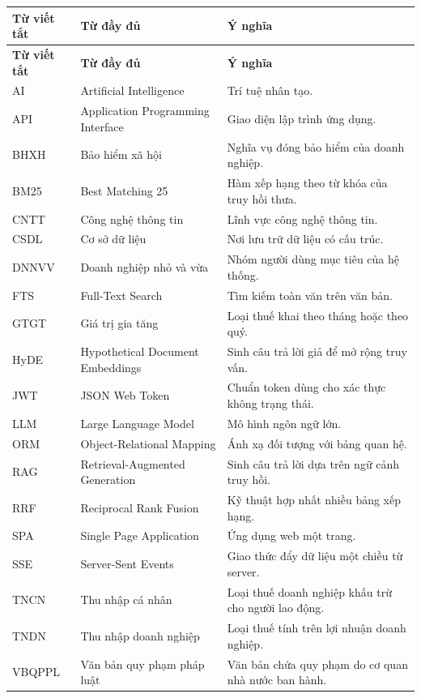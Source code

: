 \documentclass[12pt,a4paper]{report}
\numberwithin{equation}{chapter}
\numberwithin{figure}{chapter}
\numberwithin{table}{chapter}
\begin{document}
\begin{longtable}{p{2.8cm}p{5.5cm}p{6cm}}
\toprule
\textbf{Từ viết tắt} & \textbf{Từ đầy đủ} & \textbf{Ý nghĩa} \\
\midrule
\endfirsthead

\toprule
\textbf{Từ viết tắt} & \textbf{Từ đầy đủ} & \textbf{Ý nghĩa} \\
\midrule
\endhead

AI & Artificial Intelligence & Trí tuệ nhân tạo. \\
API & Application Programming Interface & Giao diện lập trình ứng dụng. \\
BHXH & Bảo hiểm xã hội & Nghĩa vụ đóng bảo hiểm của doanh nghiệp. \\
BM25 & Best Matching 25 & Hàm xếp hạng theo từ khóa của truy hồi thưa. \\
CNTT & Công nghệ thông tin & Lĩnh vực công nghệ thông tin. \\
CSDL & Cơ sở dữ liệu & Nơi lưu trữ dữ liệu có cấu trúc. \\
DNNVV & Doanh nghiệp nhỏ và vừa & Nhóm người dùng mục tiêu của hệ thống. \\
FTS & Full-Text Search & Tìm kiếm toàn văn trên văn bản. \\
GTGT & Giá trị gia tăng & Loại thuế khai theo tháng hoặc theo quý. \\
HyDE & Hypothetical Document Embeddings & Sinh câu trả lời giả để mở rộng truy vấn. \\
JWT & JSON Web Token & Chuẩn token dùng cho xác thực không trạng thái. \\
LLM & Large Language Model & Mô hình ngôn ngữ lớn. \\
ORM & Object-Relational Mapping & Ánh xạ đối tượng với bảng quan hệ. \\
RAG & Retrieval-Augmented Generation & Sinh câu trả lời dựa trên ngữ cảnh truy hồi. \\
RRF & Reciprocal Rank Fusion & Kỹ thuật hợp nhất nhiều bảng xếp hạng. \\
SPA & Single Page Application & Ứng dụng web một trang. \\
SSE & Server-Sent Events & Giao thức đẩy dữ liệu một chiều từ server. \\
TNCN & Thu nhập cá nhân & Loại thuế doanh nghiệp khấu trừ cho người lao động. \\
TNDN & Thu nhập doanh nghiệp & Loại thuế tính trên lợi nhuận doanh nghiệp. \\
VBQPPL & Văn bản quy phạm pháp luật & Văn bản chứa quy phạm do cơ quan nhà nước ban hành. \\

\bottomrule
\end{longtable}
\end{document}
